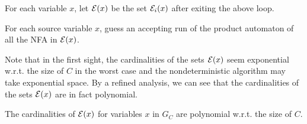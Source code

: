 For each variable $x$, let $\mathcal{E}(x)$ be the set $\mathcal{E}_i(x)$ after exiting the above loop. 

\smallskip

For each source variable $x$, guess an accepting run of the product automaton of all the NFA in $\mathcal{E}(x)$. 

\smallskip

Note that in the first sight, the cardinalities of the sets $\mathcal{E}(x)$ seem exponential w.r.t. the size of $C$ in the worst case and the nondeterministic algorithm may take exponential space. By a refined analysis, we can see that the cardinalities of the sets $\mathcal{E}(x)$ are in fact polynomial. 

\begin{proposition}
The cardinalities of $\mathcal{E}(x)$ for variables $x$ in $G_C$ are polynomial w.r.t. the size of $C$.
\end{proposition}

